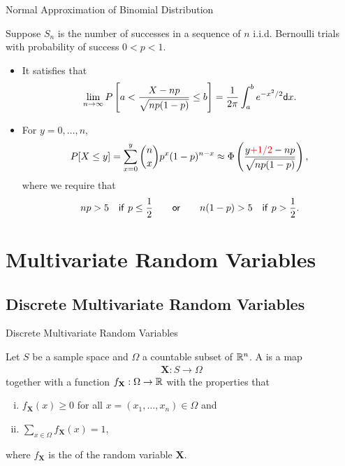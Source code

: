 \begin{frame}{Normal Approximation of Binomial Distribution}

\justifying
Suppose $S_n$ is the number of successes in a sequence of $n$ i.i.d. Bernoulli trials with probability of success $0 < p < 1$.
\begin{itemize}
	\justifying
	\item It satisfies that
	\begin{align*}
	\lim_{n\rightarrow \infty} P\left[a < \frac{X-np}{\sqrt{np(1-p)}} \leq b \right] = \frac{1}{2\pi} \int_a^b e^{-x^2/2} \mathsf{d}x.
	\end{align*}
	\item For $y = 0, \ldots, n$,
	\begin{align*}
	P[X\leq y] = \sum_{x=0}^y \binom{n}{x} p^x(1-p)^{n-x} \approx \Phi\left(\frac{y\red{+1/2}-np}{\sqrt{np(1-p)}} \right),
	\end{align*}
	where we require that
	\begin{align*}
	np > 5 \quad \mathsf{if\ } p\leq \frac{1}{2} \qquad \mathsf{or}\qquad n(1-p) > 5 \quad \mathsf{if\ } p > \frac{1}{2}.
	\end{align*}
\end{itemize}

\end{frame}



\section{Multivariate Random Variables}

\subsection{Discrete Multivariate Random Variables}

\begin{frame}{Discrete Multivariate Random Variables}

\justifying
{} Let $S$ be a sample space and $\Omega$ a countable subset of $\mathbb{R}^n$. A  is a map
\begin{align*}
\mathbf{X}: S\rightarrow \Omega
\end{align*}
together with a function $f_{\mathbf{X}}: \Omega\rightarrow\mathbb{R}$ with the properties that
\begin{enumerate}[(i).]
	\item $f_{\mathbf{X}}(x) \geq 0$ for all $x = (x_1, \ldots, x_n)\in \Omega$ and
	\item $\displaystyle \sum_{x\in \Omega} f_{\mathbf{X}}(x) = 1$,
\end{enumerate}
where $f_{\mathbf{X}}$ is the  of the random variable $\mathbf{X}$.

\end{frame}


